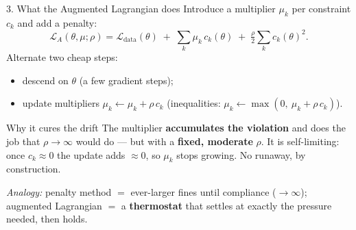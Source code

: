 \documentclass[aspectratio=169,11pt]{beamer}
\newcommand{\Ldata}{\mathcal{L}_{\text{data}}}
\begin{document}
\begin{frame}{3. What the Augmented Lagrangian does}
  Introduce a \alert{multiplier} $\mu_k$ per constraint $c_k$ and add a penalty:
  \[
    \mathcal{L}_{A}(\theta,\mu;\rho)=\Ldata(\theta)
      \;+\;\sum_k \mu_k\,c_k(\theta)
      \;+\;\tfrac{\rho}{2}\sum_k c_k(\theta)^2 .
  \]
  Alternate two cheap steps:
  \begin{itemize}
    \item descend on $\theta$ (a few gradient steps);
    \item update multipliers \;$\mu_k \leftarrow \mu_k + \rho\,c_k$\;
          \big(inequalities: $\mu_k \leftarrow \max(0,\ \mu_k+\rho\,c_k)$\big).
  \end{itemize}

  \begin{block}{Why it cures the drift}
    The multiplier \textbf{accumulates the violation} and does the job that
    $\rho\to\infty$ would do --- but with a \textbf{fixed, moderate} $\rho$.
    It is \alert{self-limiting}: once $c_k\!\approx\!0$ the update adds ${\approx}0$,
    so $\mu_k$ stops growing. No runaway, by construction.
  \end{block}

  \centering\small
  \emph{Analogy:} penalty method $=$ ever-larger fines until compliance
  ($\to\infty$); \quad augmented Lagrangian $=$ a \textbf{thermostat} that settles
  at exactly the pressure needed, then holds.
\end{frame}
\end{document}
